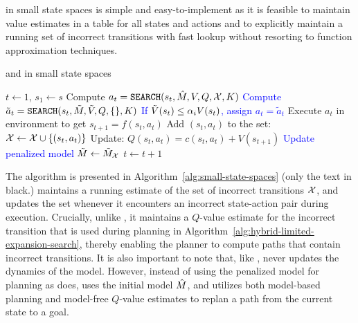\cmaxpp{} in small state spaces is simple and easy-to-implement as it
is feasible to maintain value estimates in a table for all states and
actions and to explicitly maintain a running set of incorrect
transitions with fast lookup without resorting to function
approximation techniques.


\begin{algorithm}[t]
	\caption{\cmaxpp{} and \textcolor{blue}{\acmaxpp{}} in small state spaces}
	\begin{algorithmic}[1]
		\State $t \leftarrow 1$, $s_1 \leftarrow s$
			\State Compute $a_t = \mathtt{SEARCH}(s_t, \hat{M}, V, Q, \mathcal{X}, K)$ \label{line:cmaxpp-action}
			\textcolor{blue}{
			\State Compute $\tilde{a}_t = \mathtt{SEARCH}(s_t, \tilde{M}, \tilde{V}, Q, \{\}, K)$\label{line:cmax-action}
			\State If $\tilde{V}(s_t) \leq \alpha_i V(s_t)$, assign $a_t = \tilde{a}_t$\label{line:switch}
			}
			\State Execute $a_t$ in environment to get $s_{t+1} = f(s_t, a_t)$
				\State Add $(s_t, a_t)$ to the set: $\mathcal{X} \leftarrow \mathcal{X} \cup \{(s_t, a_t)\}$
				\State Update: $Q(s_t, a_t) = c(s_t, a_t) + V(s_{t+1})$
				\textcolor{blue}{
				\State Update penalized model $\tilde{M} \leftarrow \tilde{M}_{\mathcal{X}}$
				}
			\EndIf
			\State $t \leftarrow t + 1$
		\EndWhile
		\EndFor
	\end{algorithmic}
	\label{alg:small-state-spaces}
\end{algorithm}

The algorithm is presented in Algorithm~\ref{alg:small-state-spaces}
(only the text in black.) \cmaxpp{} maintains a running estimate of the set
of incorrect transitions $\mathcal{X}$, and updates the set
whenever it encounters an incorrect state-action pair during
execution. Crucially, unlike \cmax{}, it maintains a $Q$-value estimate
for the incorrect transition that is used during planning in
Algorithm~\ref{alg:hybrid-limited-expansion-search}, thereby enabling
the planner to compute paths that contain incorrect transitions. It is
also important to note that, like \cmax{}, \cmaxpp{} never updates the
dynamics of the model. However, instead of
using the penalized model for planning as \cmax{} does, \cmaxpp{} uses the initial
model $\hat{M}$, and utilizes both model-based planning and model-free
$Q$-value estimates to replan a path from the current state to a goal.

